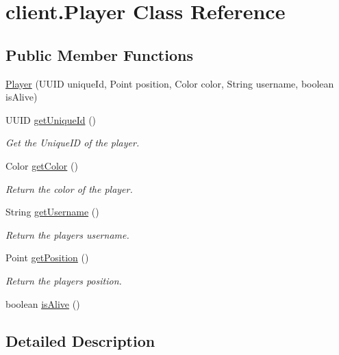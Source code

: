 \hypertarget{classclient_1_1_player}{}\section{client.\+Player Class Reference}
\label{classclient_1_1_player}
\subsection*{Public Member Functions}
\begin{DoxyCompactItemize}
\item 
\hyperlink{classclient_1_1_player_a13f87c3c7f92cf6efe4b73a2d4aca8a1}{Player} (U\+U\+ID unique\+Id, Point position, Color color, String username, boolean is\+Alive)
\item 
U\+U\+ID \hyperlink{classclient_1_1_player_a73afbf1a18acce12ba88c2b74fd41ce0}{get\+Unique\+Id} ()
\begin{DoxyCompactList}\small\item\em Get the Unique\+ID of the player. \end{DoxyCompactList}\item 
Color \hyperlink{classclient_1_1_player_a3c857d50ffcae64365e5a0914aa6f43e}{get\+Color} ()
\begin{DoxyCompactList}\small\item\em Return the color of the player. \end{DoxyCompactList}\item 
String \hyperlink{classclient_1_1_player_a0765c8775e3b2f52f6aa8c25b56d6375}{get\+Username} ()
\begin{DoxyCompactList}\small\item\em Return the player\textquotesingle{}s username. \end{DoxyCompactList}\item 
Point \hyperlink{classclient_1_1_player_a5eeedf6523a05e718de7386e234d8a8d}{get\+Position} ()
\begin{DoxyCompactList}\small\item\em Return the player\textquotesingle{}s position. \end{DoxyCompactList}\item 
boolean \hyperlink{classclient_1_1_player_a21e80dfdf04a4a9d3eff3dad411f7232}{is\+Alive} ()
\end{DoxyCompactItemize}


\subsection{Detailed Description}


